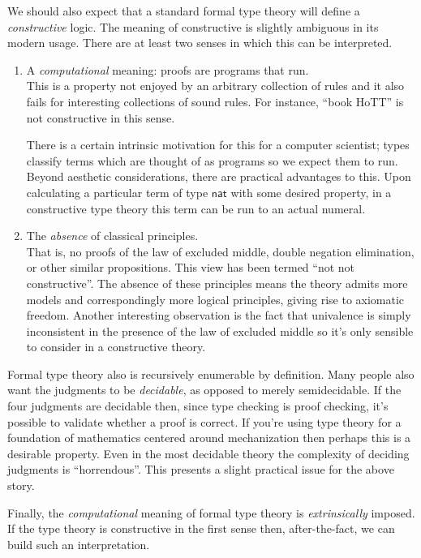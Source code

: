 \documentclass{article}
\newcommand{\nat}{\ensuremath{\mathsf{nat}}}
\begin{document}
We should also expect that a standard formal type theory will define a
\emph{constructive} logic. The meaning of constructive is slightly ambiguous
in its modern usage. There are at least two senses in which this can be
interpreted.
\begin{enumerate}
\item A \emph{computational} meaning: proofs are programs that run.\\
  This is a property not enjoyed by an arbitrary collection of rules
  and it also fails for interesting collections of sound rules. For
  instance, ``book HoTT'' is not constructive in this sense.

  There is a certain intrinsic motivation for this for a computer
  scientist; types classify terms which are thought of as programs so
  we expect them to run. Beyond aesthetic considerations, there are
  practical advantages to this. Upon calculating a particular term of
  type \nat{} with some desired property, in a constructive type
  theory this term can be run to an actual numeral.

\item The \emph{absence} of classical principles.\\
  That is, no proofs of the law of excluded middle, double negation
  elimination, or other similar propositions. This view has been
  termed ``not not constructive''. The absence of these principles
  means the theory admits more models and correspondingly more logical
  principles, giving rise to axiomatic freedom. Another interesting
  observation is the fact that univalence is simply inconsistent in
  the presence of the law of excluded middle so it's only sensible to
  consider in a constructive theory.
\end{enumerate}
Formal type theory also is recursively enumerable by definition. Many
people also want the judgments to be \emph{decidable}, as opposed to merely
semidecidable. If the four judgments are decidable then, since type
checking is proof checking, it's possible to validate whether a proof
is correct. If you're using type theory for a foundation of
mathematics centered around mechanization then perhaps this is a
desirable property. Even in the most decidable theory the complexity of
deciding judgments is ``horrendous''. This presents a slight practical
issue for the above story.

Finally, the \emph{computational} meaning of formal type theory is \emph{extrinsically}
imposed.  If the type theory is constructive in
the first sense then, after-the-fact, we can build such an
interpretation.
\end{document}
